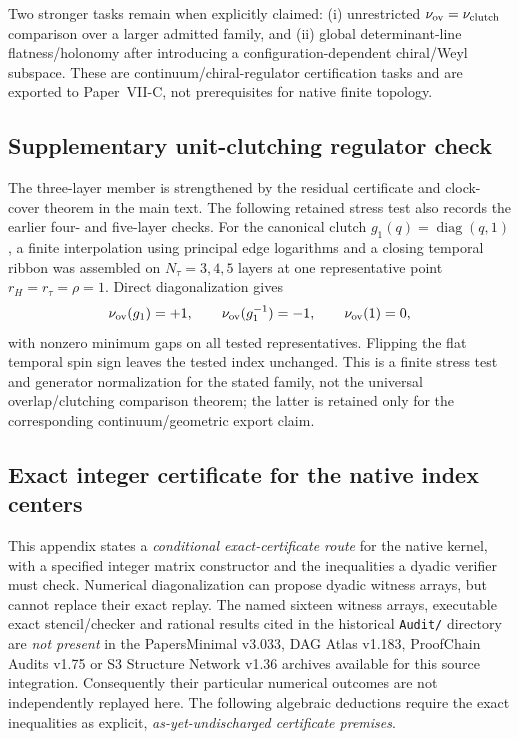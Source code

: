 \documentclass[12pt,a4paper]{article}
\begin{document}
Two stronger tasks remain when explicitly claimed: (i) unrestricted
\(\nu_{\rm ov}=\nu_{\rm clutch}\) comparison over a larger admitted family,
and (ii) global determinant-line flatness/holonomy after introducing a
configuration-dependent chiral/Weyl subspace.  These are
continuum/chiral-regulator certification tasks and are exported to Paper~VII-C,
not prerequisites for native finite topology.


\subsection{Supplementary unit-clutching regulator check}
\label{p10:app:v190-unit-clutching-check}
The three-layer member is strengthened by the residual certificate and clock-cover theorem in the main text.  The following retained stress test also records the earlier four- and five-layer checks.
For the canonical clutch $g_1(q)=\operatorname{diag}(q,1)$, a finite
interpolation using principal edge logarithms and a closing temporal ribbon
was assembled on $N_\tau=3,4,5$ layers at one representative point
$r_H=r_\tau=\rho=1$.  Direct diagonalization gives
\[
 \nu_{\rm ov}(g_1)=+1,\qquad
 \nu_{\rm ov}(g_1^{-1})=-1,\qquad
 \nu_{\rm ov}(1)=0,
\]
with nonzero minimum gaps on all tested representatives.  Flipping the flat
temporal spin sign leaves the tested index unchanged.  This is a finite
stress test and generator normalization for the stated family, not the
universal overlap/clutching comparison theorem; the latter is retained only
for the corresponding continuum/geometric export claim.


\subsection{Exact integer certificate for the native index centers}
\label{p10:app:v256-exact-inertia-certificate}
This appendix states a \emph{conditional exact-certificate route} for the native
kernel, with a specified integer matrix constructor and the inequalities a
dyadic verifier must check. Numerical diagonalization can propose dyadic
witness arrays, but cannot replace their exact replay. The named sixteen
witness arrays, executable exact stencil/checker and rational results cited
in the historical \texttt{Audit/} directory are \emph{not present} in the
PapersMinimal v3.033, DAG Atlas v1.183, ProofChain Audits v1.75 or S3
Structure Network v1.36 archives available for this source integration.
Consequently their particular numerical outcomes are not independently
replayed here. The following algebraic deductions require the exact
inequalities as explicit, \emph{as-yet-undischarged certificate premises}.
\end{document}
